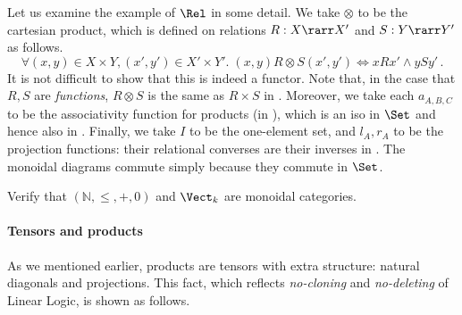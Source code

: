 \documentclass[12pt]{article}
\begin{document}
%
Let us examine the example of $\Rel$ in some detail. We take $\otimes$ to be the cartesian product, which is defined on relations $R:X\rarr X'$ and
$S:Y\rarr Y'$ as follows.
\[ \forall(x,y)\in X\times Y,(x',y')\in X'\times Y'.\; (x,y)R\otimes S(x',y')\iff xRx'\land ySy'\,. \]
%
It is not difficult to show that this is  indeed a functor. Note that, in the case that $R,S$ are \emph{functions}, $R\otimes S$ is the same as $R\times S$ in
\Set. Moreover, we take each $a_{A,B,C}$ to be the associativity function for products (in \Set), which is an iso in $\Set$ and hence also in \Rel.
Finally, we take $I$ to be the one-element set, and $l_A,r_A$ to be the projection functions: their relational converses are their inverses in \Rel.
The monoidal diagrams commute simply because they commute in $\Set$.
\begin{myexercise}
Verify that $(\mathbb{N}, \leq , + , 0)$ and $\Vect_k$ are monoidal categories.
\end{myexercise}

\paragraph{Tensors and products}
As we mentioned earlier, products are tensors with extra structure: natural diagonals and projections. This fact, which reflects \emph{no-cloning} and
\emph{no-deleting} of Linear Logic, is shown as follows.
\end{document}
